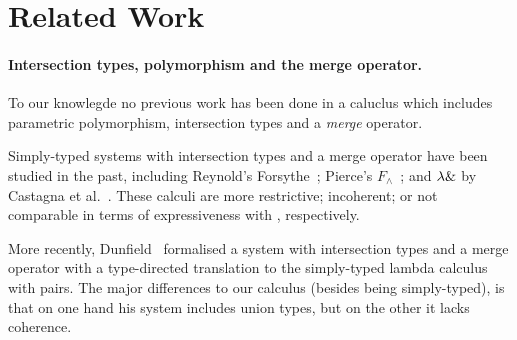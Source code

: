 \section{Related Work}
\label{sec:related-work}
\paragraph{Intersection types, polymorphism and the merge operator.}
To our knowlegde no previous work has been done in a caluclus which
includes parametric polymorphism, intersection types and a \emph{merge} operator.

Simply-typed systems with intersection types and a merge operator have been studied
in the past, including Reynold's Forsythe~\cite{reynolds1997design}; 
Pierce's $F_\wedge$~\cite{pierce1991programming2}; and
$\lambda \&$ by Castagna et al.~\cite{Castagna92calculus}.
These calculi are more restrictive; incoherent; or not comparable in terms of expressiveness
with \name, respectively.
\begin{comment}
Concerning simply-typed systems, the oldest work dates back to the 1980s,
when Reynolds invented Forsythe~\cite{reynolds1997design}, with his
merge-like operator being noted as $p_1, p_2$.
Even though his calculus was proven to be coherent~\cite{reynolds1991coherence},
it uses a form of biased choice by having precedence in typing rules for intersections.
His system is also arguably more restrictive than ours since it forbids, for instance,
the merge of two functions.

Pierce~\cite{pierce1991programming2} made a comprehensive review
of coherence, but he was unable to prove it for his $F_\wedge$ calculus. 
He introduced a primitive $\code{glue}$ function as
a language extension which corresponds to our merge operator. 
However, users can ``glue'' two arbitrary values, which may lead to incoherence.

Castagna et al.~\cite{Castagna92calculus} proposed $\lamint$ to study
the overloading problem for functions. 
They have a special merge for functions and also a special function application
for these merges.
Their calculus is coherent and they also employ well-formedness conditions on their 
(functional) merges. 
These conditions are incompatible with systems like ours -- which allow arbitrary
intersections -- and thus are hard to compare in terms of expressiveness.
This means that $\lamint$ accepts different functional merges than \name and 
vice-versa.
\end{comment}
More recently, Dunfield~\cite{dunfield2014elaborating} formalised a system with
intersection types and a merge operator with a type-directed translation to the
simply-typed lambda calculus with pairs.
The major differences to our calculus (besides being simply-typed), is that on one
hand his system includes union types, but on the other it lacks coherence.

